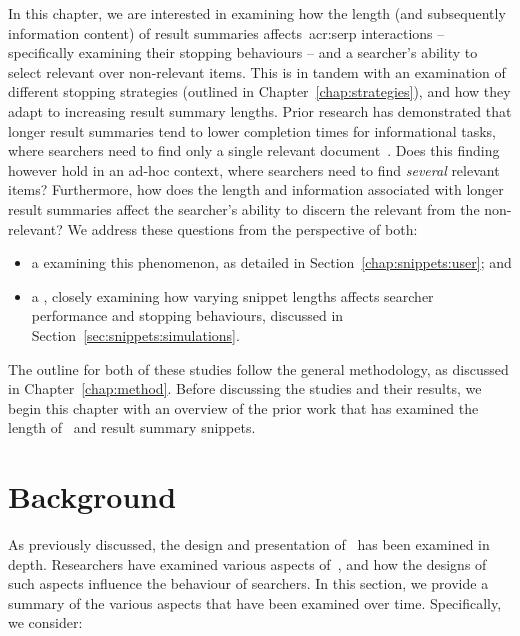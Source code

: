 
In this chapter, we are interested in examining how the length (and subsequently information content) of result summaries affects~\gls{acr:serp} interactions -- specifically examining their stopping behaviours -- and a searcher's ability to select relevant over non-relevant items. This is in tandem with an examination of different stopping strategies (outlined in Chapter~\ref{chap:strategies}), and how they adapt to increasing result summary lengths. Prior research has demonstrated that longer result summaries tend to lower completion times for informational tasks, where searchers need to find only a single relevant document~\citep{cutrell2007eye_tracking}. Does this finding however hold in an ad-hoc context, where searchers need to find \emph{several} relevant items? Furthermore, how does the length and information associated with longer result summaries affect the searcher's ability to discern the relevant from the non-relevant? We address these questions from the perspective of both:

\begin{itemize}
    \item{a  examining this phenomenon, as detailed in Section~\ref{chap:snippets:user}; and}
    \item{a , closely examining how varying snippet lengths affects searcher performance and stopping behaviours, discussed in Section~\ref{sec:snippets:simulations}.}
\end{itemize}

The outline for both of these studies follow the general methodology, as discussed in Chapter~\ref{chap:method}. Before discussing the studies and their results, we begin this chapter with an overview of the prior work that has examined the length of~ and result summary snippets.

\section{Background}\label{chap:snippets:background}
As previously discussed, the design and presentation of~ has been examined in depth. Researchers have examined various aspects of~, and how the designs of such aspects influence the behaviour of searchers. In this section, we provide a summary of the various aspects that have been examined over time. Specifically, we consider:

